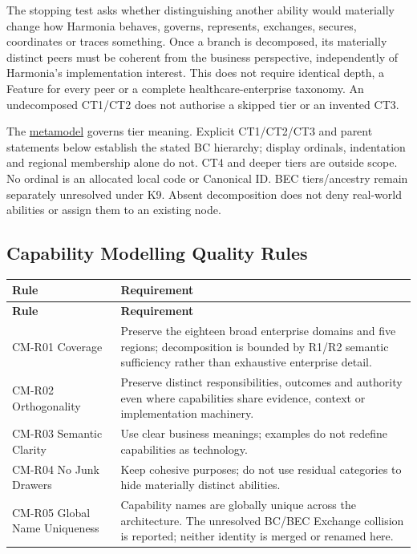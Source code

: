 The stopping test asks whether distinguishing another ability would materially change how Harmonia behaves, governs, represents, exchanges, secures, coordinates or traces something. Once a branch is decomposed, its materially distinct peers must be coherent from the business perspective, independently of Harmonia's implementation interest. This does not require identical depth, a Feature for every peer or a complete healthcare-enterprise taxonomy. An undecomposed CT1/\allowbreak{}CT2 does not authorise a skipped tier or an invented CT3.

\label{rad:business:53}

The \hyperref[rad:metamodel:33]{metamodel} governs tier meaning. Explicit CT1/\allowbreak{}CT2/\allowbreak{}CT3 and parent statements below establish the stated BC hierarchy; display ordinals, indentation and regional membership alone do not. CT4 and deeper tiers are outside scope. No ordinal is an allocated local code or Canonical ID. BEC tiers/\allowbreak{}ancestry remain separately unresolved under K9. Absent decomposition does not deny real-world abilities or assign them to an existing node.

\label{rad:business:61}
\subsection*{Capability Modelling Quality Rules}
\label{rad:business:63}
\begingroup\small\setlength{\TableWidth}{\dimexpr\linewidth-4\tabcolsep-3\arrayrulewidth\relax}
\begin{longtable}{|>{\raggedright\arraybackslash}p{0.35\TableWidth}|>{\raggedright\arraybackslash}p{0.65\TableWidth}|}
\hline\rowcolor{TableHead}\textbf{Rule} & \textbf{Requirement}\\\hline\endfirsthead
\hline\rowcolor{TableHead}\textbf{Rule} & \textbf{Requirement}\\\hline\endhead
\hline\endfoot
CM-R01 Coverage & Preserve the eighteen broad enterprise domains and five regions; decomposition is bounded by R1/\allowbreak{}R2 semantic sufficiency rather than exhaustive enterprise detail.\\\hline
CM-R02 Orthogonality & Preserve distinct responsibilities, outcomes and authority even where capabilities share evidence, context or implementation machinery.\\\hline
CM-R03 Semantic Clarity & Use clear business meanings; examples do not redefine capabilities as technology.\\\hline
CM-R04 No Junk Drawers & Keep cohesive purposes; do not use residual categories to hide materially distinct abilities.\\\hline
CM-R05 Global Name Uniqueness & Capability names are globally unique across the architecture. The unresolved BC/\allowbreak{}BEC Exchange collision is reported; neither identity is merged or renamed here.\\\hline
\end{longtable}\endgroup
{}\label{rad:business:71}
